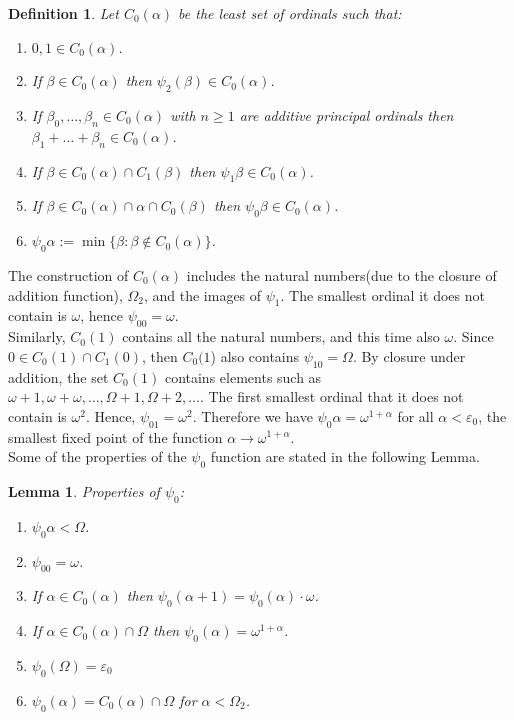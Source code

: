 \documentclass{amsart}
\theoremstyle{plain}
\theoremstyle{plain}
\newtheorem{lemma}[theorem]{Lemma}
\newtheorem*{definition}{Definition}
\newcommand{\Om}{{\Omega}}
\newcommand{\al}{{\alpha}}
\newcommand{\be}{{\beta}}
\newcommand{\om}{\omega}
\begin{document}
\begin{definition} Let $C_0(\al)$ be the least set of ordinals such that:
	\begin{enumerate}
		\item $ 0,1 \in C_0(\al)$.
		\item If $\be \in C_0(\al)$ then $\psi_2(\be) \in C_0(\al)$.
		\item If $\be_0,\ldots , \be_n \in C_0(\al) $  with $n \geq 1$ are additive  principal ordinals then $\be_1+  \ldots  + \be_n \in C_0(\al)$.
		\item  If $\be\in C_0(\al)\cap C_1(\be)$  then $\psi_1 \be\in C_0(\al)$. 
		\item If $\be\in C_0(\al)\cap \al \cap C_0(\be)$ then $\psi_0 \be\in C_0(\al)$.
		\item 	$\psi_0\al:=\min\{\be:\be\not\in C_0(\al)\}$.
	\end{enumerate}
\end{definition}

The construction of $C_0(\alpha)$ includes the natural numbers(due to the closure of addition function), $\Om_2$, and the images of $\psi_1$. The smallest ordinal it does not contain is $\om$, hence $\psi_00=\om$.\medskip
\\
Similarly, $C_0(1)$ contains all the natural numbers, and this time also $\om$. Since $0 \in C_0(1)\cap C_1(0)$, then $C_0(1$) also contains $\psi_10=\Om$. By closure under addition, the set $C_0(1)$ contains elements such as $\om+1,\om+\om,\ldots, \Om+1, \Om+2,\ldots$. The first smallest ordinal that it does not contain is $\om^2$. Hence, $\psi_01=\om^2$.
Therefore we have $\psi_0\al=\om^{1+\al}$ for all $\al<\varepsilon_0$, the smallest fixed point of the function $\al\rightarrow\om^{1+\al}$.\\
Some of the properties of the $\psi_0$ function are stated in the following Lemma.

\begin{lemma} Properties of $\psi_0$:
	\begin{enumerate}
		\item $\psi_0\al<\Om$. 
		\item $\psi_00=\om$.
		\item  If $\al\in C_0(\al)$ then $\psi_0(\al+1)=\psi_0(\al)\cdot \om$.
		\item  If $\al \in C_0(\al)\cap \Om$ then $\psi_0(\al) = \om^{1+\al}$.
		\item $\psi_0(\Om)=\varepsilon_0$
		\item $\psi_0(\al)=C_0(\al)\cap \Om$ for $\al<\Om_2$.
	\end{enumerate}
\end{lemma}
\end{document}
